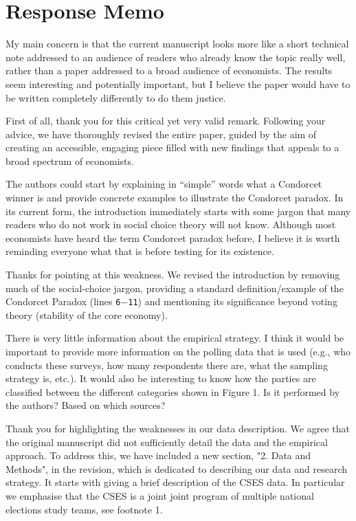 \documentclass[a4paper, 12pt]{scrartcl}
\theoremstyle{break}
\newenvironment{changes}{\par\color{violet}\par\addvspace{\baselineskip}}{\par\addvspace{\baselineskip}}
\begin{document}
\section*{Response Memo}
\begin{changes}
My main concern is that the current manuscript looks more like a short technical note addressed to an audience of readers who already know the topic really well, rather than a paper addressed to a broad audience of economists. The results seem interesting and potentially important, but I believe the paper would have to be written completely differently to do them justice.
\end{changes}

First of all, thank you for this critical yet very valid remark. Following your advice, we have thoroughly revised the entire paper, guided by the aim of creating an accessible, engaging piece filled with new findings that appeals to a broad spectrum of economists.

\begin{changes}
The authors could start by explaining in “simple” words what a Condorcet winner is and provide concrete examples to illustrate the Condorcet paradox. In its current form, the introduction immediately starts with some jargon that many readers who do not work in social choice theory will not know. Although most economists have heard the term Condorcet paradox before, I believe it is worth reminding everyone what that is before testing for its existence.
\end{changes}

Thanks for pointing at this weakness. We revised the introduction by removing much of the social-choice jargon, providing a standard definition/example of the Condorcet Paradox (lines \texttt{6$-$11}) and mentioning its significance beyond voting theory (stability of the core economy). 

\begin{changes}
There is very little information about the empirical strategy. I think it would be important to provide more information on the polling data that is used (e.g., who conducts these surveys, how many respondents there are, what the sampling strategy is, etc.). It would also be interesting to know how the parties are classified between the different categories shown in Figure 1. Is it performed by the authors? Based on which sources?
\end{changes}

Thank you for highlighting the weaknesses in our data description. We agree that the original manuscript did not sufficiently detail the data and the empirical approach. To address this, we have included a new section, "2. Data and Methods", in the revision, which is dedicated to describing our data and research strategy. It starts with giving a brief description of the CSES data. In particular we emphasise that the CSES is a joint joint program of multiple national elections study teams, see footnote 1.
\end{document}
